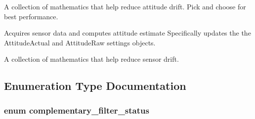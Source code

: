 A collection of mathematics that help reduce attitude drift. Pick and choose for best performance.

Acquires sensor data and computes attitude estimate Specifically updates the the Attitude\-Actual and Attitude\-Raw settings objects.

A collection of mathematics that help reduce sensor drift.

\subsection{Enumeration Type Documentation}
\hypertarget{group___attitude_ga2a3dfab57b52ff023f9197d9afe06ff4}{
\subsubsection[{complementary\-\_\-filter\-\_\-status}]{\setlength{\rightskip}{0pt plus 5cm}enum {\bf complementary\-\_\-filter\-\_\-status}}}\label{group___attitude_ga2a3dfab57b52ff023f9197d9afe06ff4}
